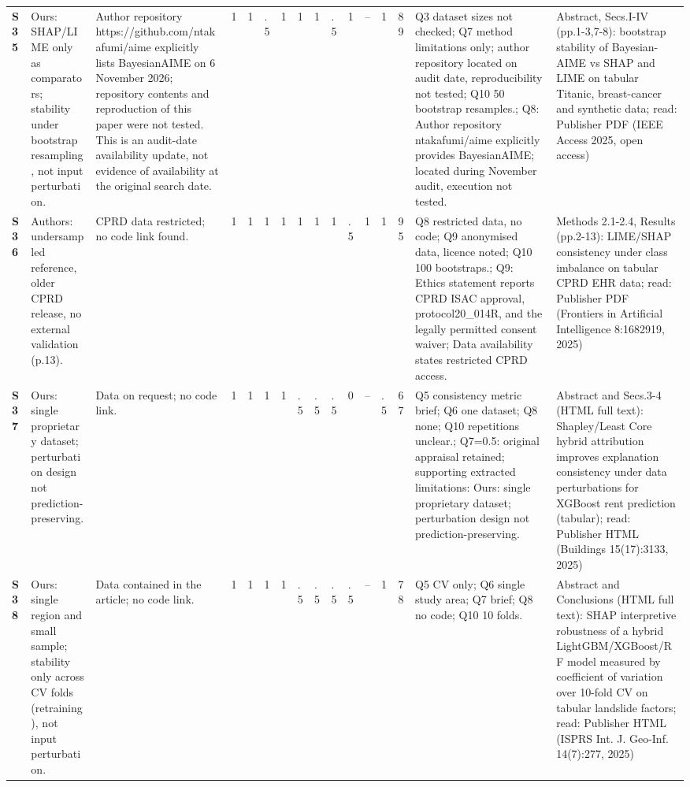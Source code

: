 \begin{longtable}{@{}P{1.0cm}P{4.6cm}P{3.6cm}P{0.3cm}P{0.3cm}P{0.3cm}P{0.3cm}P{0.3cm}P{0.3cm}P{0.3cm}P{0.3cm}P{0.3cm}P{0.36cm}P{0.75cm}P{3.0cm}P{3.9cm}@{}}
\textbf{S35} & Ours: SHAP/\allowbreak{}LIME only as comparators; stability under bootstrap resampling, not input perturbation. & Author repository https:/\allowbreak{}/\allowbreak{}github.com/\allowbreak{}ntakafumi/\allowbreak{}aime explicitly lists BayesianAIME on 6 November 2026; repository contents and reproduction of this paper were not tested. This is an audit-date availability update, not evidence of availability at the original search date. & 1 & 1 & .5 & 1 & 1 & 1 & .5 & 1 & -- & 1 & 89 & Q3 dataset sizes not checked; Q7 method limitations only; author repository located on audit date, reproducibility not tested; Q10 50 bootstrap resamples.; Q8: Author repository ntakafumi/\allowbreak{}aime explicitly provides BayesianAIME; located during November audit, execution not tested. & Abstract, Secs.I-IV (pp.1-3,7-8): bootstrap stability of Bayesian-AIME vs SHAP and LIME on tabular Titanic, breast-cancer and synthetic data; read: Publisher PDF (IEEE Access 2025, open access) \\
\textbf{S36} & Authors: undersampled reference, older CPRD release, no external validation (p.13). & CPRD data restricted; no code link found. & 1 & 1 & 1 & 1 & 1 & 1 & 1 & .5 & 1 & 1 & 95 & Q8 restricted data, no code; Q9 anonymised data, licence noted; Q10 100 bootstraps.; Q9: Ethics statement reports CPRD ISAC approval, protocol20\_\allowbreak{}014R, and the legally permitted consent waiver; Data availability states restricted CPRD access. & Methods 2.1-2.4, Results (pp.2-13): LIME/\allowbreak{}SHAP consistency under class imbalance on tabular CPRD EHR data; read: Publisher PDF (Frontiers in Artificial Intelligence 8:1682919, 2025) \\
\textbf{S37} & Ours: single proprietary dataset; perturbation design not prediction-preserving. & Data on request; no code link. & 1 & 1 & 1 & 1 & .5 & .5 & .5 & 0 & -- & .5 & 67 & Q5 consistency metric brief; Q6 one dataset; Q8 none; Q10 repetitions unclear.; Q7=0.5: original appraisal retained; supporting extracted limitations: Ours: single proprietary dataset; perturbation design not prediction-preserving. & Abstract and Secs.3-4 (HTML full text): Shapley/\allowbreak{}Least Core hybrid attribution improves explanation consistency under data perturbations for XGBoost rent prediction (tabular); read: Publisher HTML (Buildings 15(17):3133, 2025) \\
\textbf{S38} & Ours: single region and small sample; stability only across CV folds (retraining), not input perturbation. & Data contained in the article; no code link. & 1 & 1 & 1 & 1 & .5 & .5 & .5 & .5 & -- & 1 & 78 & Q5 CV only; Q6 single study area; Q7 brief; Q8 no code; Q10 10 folds. & Abstract and Conclusions (HTML full text): SHAP interpretive robustness of a hybrid LightGBM/\allowbreak{}XGBoost/\allowbreak{}RF model measured by coefficient of variation over 10-fold CV on tabular landslide factors; read: Publisher HTML (ISPRS Int. J. Geo-Inf. 14(7):277, 2025) \\

\end{longtable}
